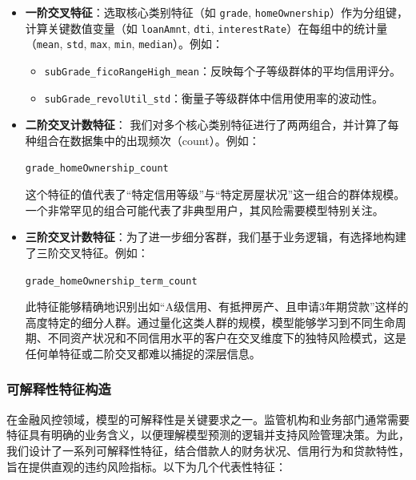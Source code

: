 \documentclass{thuemp}
\begin{document}
\begin{itemize}
    \item \textbf{一阶交叉特征}：选取核心类别特征（如 \texttt{grade}, \texttt{homeOwnership}）作为分组键，计算关键数值变量（如 \texttt{loanAmnt}, \texttt{dti}, \texttt{interestRate}）在每组中的统计量（\texttt{mean}, \texttt{std}, \texttt{max}, \texttt{min}, \texttt{median}）。例如：
    \begin{itemize}
        \item \texttt{subGrade\_ficoRangeHigh\_mean}：反映每个子等级群体的平均信用评分。
        \item \texttt{subGrade\_revolUtil\_std}：衡量子等级群体中信用使用率的波动性。
    \end{itemize}
    \item \textbf{二阶交叉计数特征}：
    我们对多个核心类别特征进行了两两组合，并计算了每种组合在数据集中的出现频次（count）。例如：
    
    \texttt{grade\_homeOwnership\_count}
    
    这个特征的值代表了“特定信用等级”与“特定房屋状况”这一组合的群体规模。一个非常罕见的组合可能代表了非典型用户，其风险需要模型特别关注。
    \item \textbf{三阶交叉计数特征}：为了进一步细分客群，我们基于业务逻辑，有选择地构建了三阶交叉特征。例如：
    
    \texttt{grade\_homeOwnership\_term\_count}
    
    此特征能够精确地识别出如“A级信用、有抵押房产、且申请3年期贷款”这样的高度特定的细分人群。通过量化这类人群的规模，模型能够学习到不同生命周期、不同资产状况和不同信用水平的客户在交叉维度下的独特风险模式，这是任何单特征或二阶交叉都难以捕捉的深层信息。
\end{itemize}

\subsubsection{可解释性特征构造}

在金融风控领域，模型的可解释性是关键要求之一。监管机构和业务部门通常需要特征具有明确的业务含义，以便理解模型预测的逻辑并支持风险管理决策。为此，我们设计了一系列可解释性特征，结合借款人的财务状况、信用行为和贷款特性，旨在提供直观的违约风险指标。以下为几个代表性特征：
\end{document}
